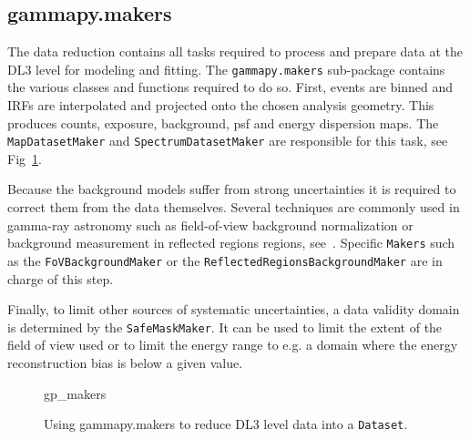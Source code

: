 \subsection{gammapy.makers}
\label{ssec:gammapy-makers}


The data reduction contains all tasks required to process and prepare data at the DL3
level for modeling and fitting. The \texttt{gammapy.makers} sub-package contains the various
classes and functions required to do so.
First, events are binned and IRFs are interpolated and
projected onto the chosen analysis geometry. This produces counts, exposure, background, psf
and energy dispersion maps. The \texttt{MapDatasetMaker} and \texttt{SpectrumDatasetMaker}
are responsible for this task, see Fig~\ref{ig*:minted:gp_makers}.

Because the background models suffer from strong uncertainties it is required to correct
them from the data themselves. Several techniques are commonly used in gamma-ray astronomy
such as field-of-view background normalization or background measurement in reflected regions 
regions, see~\cite{Berge07}. Specific \texttt{Makers} such as the \texttt{FoVBackgroundMaker}
or the \texttt{ReflectedRegionsBackgroundMaker} are in charge of this step.

Finally, to limit other sources of systematic uncertainties, a data validity domain is
determined by the \texttt{SafeMaskMaker}. It can be used to limit the extent of the field
of view used or to limit the energy range to e.g. a domain where the energy reconstruction
bias is below a given value.



\begin{figure}
	{gp_makers}

	\caption{Using gammapy.makers to reduce DL3 level data into a \texttt{Dataset}.}
	\label{ig*:minted:gp_makers}
\end{figure}
